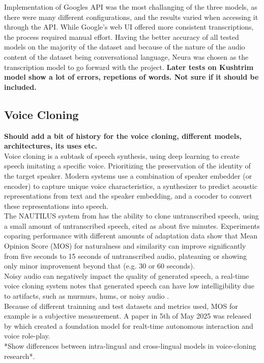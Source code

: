 \documentclass[12pt]{article}
\begin{document}
Implementation of Googles API was the most challanging of the three models, as there were many different configurations, and the results varied when accessing it through the API. While Google's web UI offered more consistent transcriptions, the process required manual effort. Having the better accuracy of all tested models on the majority of the dataset and because of the nature of the audio content of the dataset being conversational language, Neura was chosen as the transcription model to go forward with the project. \textbf{Later tests on Kushtrim model show a lot of errors, repetions of words. Not sure if it should be included.}

\subsection{Voice Cloning}
\textbf{Should add a bit of history for the voice cloning, different models, architectures, its uses etc.}\\Voice cloning is a subtask of speech synthesis, using deep learning to create speech imitating a specific voice. Prioritizing the preservation of the identity of the target speaker. Modern systems use a combination of speaker embedder (or encoder) to capture unique voice characteristics, a synthesizer to predict acoustic representations from text and the speaker embedding, and a cocoder to convert these representations into speech.\\
The NAUTILUS system from \cite{NAUTILUS} has the ability to clone untranscribed speech, using a small amount of untranscribed speech, cited as about five minutes. Experiments coparing performance with different amounts of adaptation data show that Mean Opinion Score (MOS) for naturalness and similarity can improve significantly from five seconds to 15 seconds of untranscribed audio, plateauing or showing only minor improvement beyond that (e.g. 30 or 60 seconds)\cite{Unified_system_for_Voice_Cloning_and_Voice_Conversion}.\\ 
Noisy audio can negatively impact the quality of generated speech, a real-time voice cloning system notes that generated speech can have low intelligibility due to artifacts, such as murmurs, hums, or noisy audio \cite{Real-time_voice_cloning_system}.\\
Because of different trainning and test datasets and metrics used, MOS for example is a subjective measurement.
A paper in 5th of May 2025 was released by \cite{viola-voice-role-play} which created a foundation model for realt-time autonomous interaction and voice role-play. \\
*Show differences between intra-lingual and cross-lingual models in voice-cloning research*. 
\end{document}
